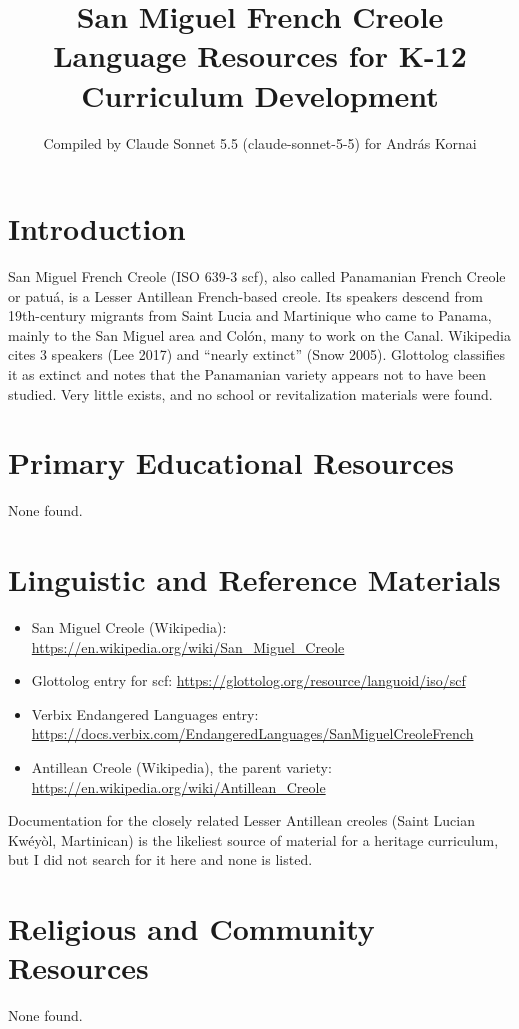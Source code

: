 \documentclass[12pt]{article}
\title{San Miguel French Creole Language Resources for K-12 Curriculum Development}
\author{Compiled by Claude Sonnet 5.5 (claude-sonnet-5-5) for Andr\'as Kornai}
\date{}
\begin{document}
\maketitle

\section{Introduction}
San Miguel French Creole (ISO 639-3 scf), also called Panamanian French Creole or patuá, is a Lesser Antillean French-based creole. Its speakers descend from 19th-century migrants from Saint Lucia and Martinique who came to Panama, mainly to the San Miguel area and Colón, many to work on the Canal. Wikipedia cites 3 speakers (Lee 2017) and ``nearly extinct'' (Snow 2005). Glottolog classifies it as extinct and notes that the Panamanian variety appears not to have been studied. Very little exists, and no school or revitalization materials were found.

\section{Primary Educational Resources}
None found.

\section{Linguistic and Reference Materials}
\begin{itemize}
\item San Miguel Creole (Wikipedia): \url{https://en.wikipedia.org/wiki/San_Miguel_Creole}
\item Glottolog entry for scf: \url{https://glottolog.org/resource/languoid/iso/scf}
\item Verbix Endangered Languages entry: \url{https://docs.verbix.com/EndangeredLanguages/SanMiguelCreoleFrench}
\item Antillean Creole (Wikipedia), the parent variety: \url{https://en.wikipedia.org/wiki/Antillean_Creole}
\end{itemize}
Documentation for the closely related Lesser Antillean creoles (Saint Lucian Kwéyòl, Martinican) is the likeliest source of material for a heritage curriculum, but I did not search for it here and none is listed.

\section{Religious and Community Resources}
None found.
\end{document}
